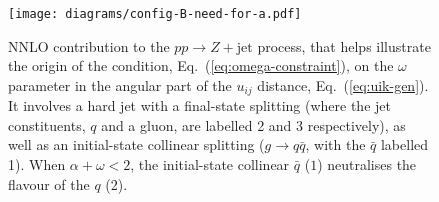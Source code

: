 \documentclass[nofootinbib,twocolumn,preprintnumbers,superscriptaddress,aps]{revtex4-2}
\begin{document}
\begin{figure}
  \centering
  \texttt{[image: diagrams/config-B-need-for-a.pdf]}
  \caption{
    NNLO contribution to the $pp\to Z+\text{jet}$ process, that 
    helps illustrate the origin
    of the condition, Eq.~(\ref{eq:omega-constraint}), on the $\omega$
    parameter in the angular part of the $u_{ij}$ distance,
    Eq.~(\ref{eq:uik-gen}). 
    It involves a hard jet with a final-state splitting (where the jet
    constituents, $q$ and a gluon, are labelled 2 and 3 respectively),
    as well as an  initial-state collinear
    splitting ($g \to q \bar q$, with the $\bar q$ labelled 1).
    When $\alpha + \omega < 2$, the initial-state collinear $\bar q$
    ($1$) neutralises the flavour of the $q$ ($2$).
  }
  \label{fig:config-as2-IHC-FmaybeC}
\end{figure}
\end{document}
